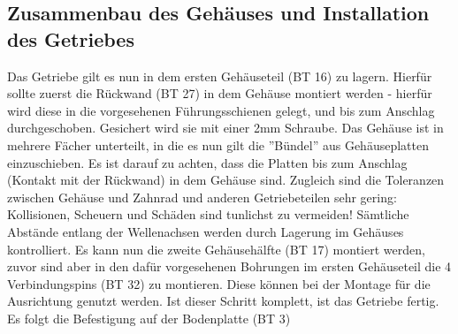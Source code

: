 \documentclass[10pt, a4paper]{article}
\begin{document}
\subsection{Zusammenbau des Gehäuses und Installation des Getriebes}
Das Getriebe gilt es nun in dem ersten Gehäuseteil (BT 16) zu lagern. Hierfür sollte zuerst die Rückwand (BT 27) in dem Gehäuse montiert werden - hierfür wird diese in die vorgesehenen Führungsschienen gelegt, und bis zum Anschlag durchgeschoben. Gesichert wird sie mit einer 2mm Schraube. Das Gehäuse ist in mehrere Fächer unterteilt, in die es nun gilt die ''Bündel'' aus Gehäuseplatten einzuschieben. Es ist darauf zu achten, dass die Platten bis zum Anschlag (Kontakt mit der Rückwand) in dem Gehäuse sind. Zugleich sind die Toleranzen zwischen Gehäuse und Zahnrad und anderen Getriebeteilen sehr gering: Kollisionen, Scheuern und Schäden sind tunlichst zu vermeiden! Sämtliche Abstände entlang der Wellenachsen werden durch Lagerung im Gehäuses kontrolliert. Es kann nun die zweite Gehäusehälfte (BT 17) montiert werden, zuvor sind aber in den dafür vorgesehenen Bohrungen im ersten Gehäuseteil die 4 Verbindungspins (BT 32) zu montieren. Diese können bei der Montage für die Ausrichtung genutzt werden. Ist dieser Schritt komplett, ist das Getriebe fertig. Es folgt die Befestigung auf der Bodenplatte (BT 3)
\vspace{-20pt}
\begin{flushleft}
  \begin{minipage}{0.33\textwidth}
    \vspace{-20pt}
  \end{minipage}
  \begin{minipage}{0.33\textwidth}
    \vspace{12pt}
    \vspace{-20pt}
  \end{minipage}
\end{flushleft}

\newpage
\end{document}
